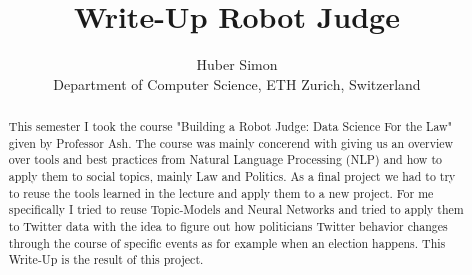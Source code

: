 \documentclass[10pt,conference,compsocconf]{IEEEtran}
\begin{document}
\title{Write-Up Robot Judge}

\author{
  Huber Simon\\
  Department of Computer Science, ETH Zurich, Switzerland
}

\maketitle

\begin{abstract}
  This semester I took the course "Building a Robot Judge: Data Science For the Law" given by Professor Ash. The course was mainly concerend with giving us an overview over tools and best practices from Natural Language Processing (NLP) and how to apply them to social topics, mainly Law and Politics. As a final project we had to try to reuse the tools learned in the lecture and apply them to a new project. For me specifically I tried to reuse Topic-Models and Neural Networks and tried to apply them to Twitter data with the idea to figure out how politicians Twitter behavior changes through the course of specific events as for example when an election happens. This Write-Up is the result of this project. 
  
\end{abstract}
\end{document}
